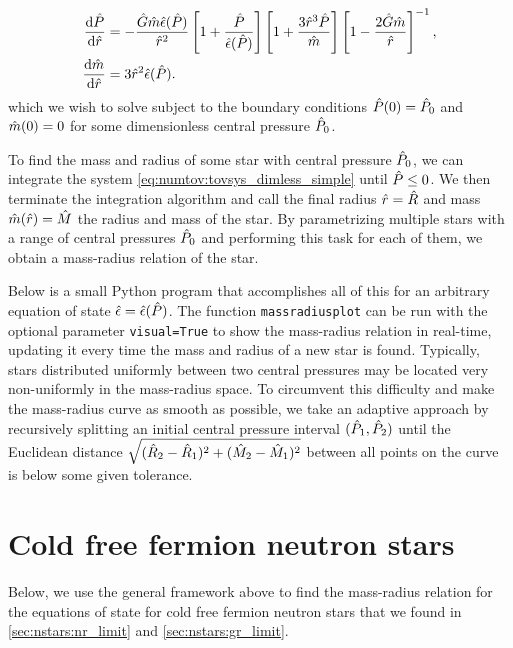 \begin{subequations}
\label{eq:numtov:tovsys_dimless_simple}
\begin{align}
	\odv{\diml{P}}{\diml{r}} &= - \frac{\diml{G} \diml{m} \diml{\epsilon}(\diml{P})}{\diml{r}^2} \left[ 1 + \frac{\diml{P}}{\diml{\epsilon}(\diml{P})} \right] \left[ 1 + \frac{3 \diml{r}^3 \diml{P}}{\diml{m}} \right] \left[ 1 - \frac{2 \diml{G} \diml{m}}{\diml{r}} \right]^{-1} , \\
	\odv{\diml{m}}{\diml{r}} &= 3 \diml{r}^2 \diml{\epsilon}(\diml{P}) .
\end{align}
\end{subequations}
which we wish to solve subject to the boundary conditions $\hat{P}(0) = \hat{P}_0$ and $\hat{m}(0) = 0$ for some dimensionless central pressure $\hat{P}_0$.

To find the mass and radius of some star with central pressure $\hat{P}_0$, we can integrate the system \eqref{eq:numtov:tovsys_dimless_simple} until $\hat{P} \le 0$.
We then terminate the integration algorithm and call the final radius $\hat{r} = \hat{R}$ and mass $\hat{m}(\hat{r}) = \hat{M}$ the radius and mass of the star.
By parametrizing multiple stars with a range of central pressures $\hat{P}_0$ and performing this task for each of them, we obtain a mass-radius relation of the star.

Below is a small Python program that accomplishes all of this for an arbitrary equation of state $\hat{\epsilon} = \hat{\epsilon}(\hat{P})$.
The function \verb|massradiusplot| can be run with the optional parameter \verb|visual=True| to show the mass-radius relation in real-time, updating it every time the mass and radius of a new star is found.
Typically, stars distributed uniformly between two central pressures may be located very non-uniformly in the mass-radius space.
To circumvent this difficulty and make the mass-radius curve as smooth as possible, we take an adaptive approach by recursively splitting an initial central pressure interval $(\hat{P}_1, \hat{P}_2)$ until the Euclidean distance $\sqrt{(\hat{R}_2-\hat{R}_1)^2 + (\hat{M}_2-\hat{M}_1)^2}$ between all points on the curve is below some given tolerance.


\section{Cold free fermion neutron stars}

Below, we use the general framework above to find the mass-radius relation for the equations of state for cold free fermion neutron stars that we found in \cref{sec:nstars:nr_limit} and \cref{sec:nstars:gr_limit}.

